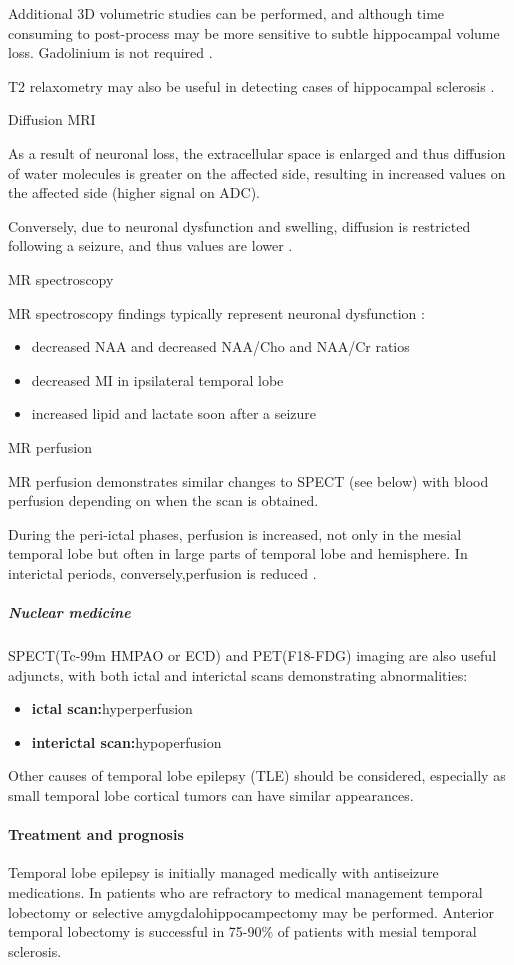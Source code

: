 Additional 3D volumetric studies can be performed, and although time consuming to post-process may be more sensitive to subtle hippocampal volume loss. Gadolinium is not required .

T2 relaxometry may also be useful in detecting cases of hippocampal sclerosis .

Diffusion MRI

As a result of neuronal loss, the extracellular space is enlarged and thus diffusion of water molecules is greater on the affected side, resulting in increased values on the affected side (higher signal on ADC).

Conversely, due to neuronal dysfunction and swelling, diffusion is restricted following a seizure, and thus values are lower .

MR spectroscopy

MR spectroscopy findings typically represent neuronal dysfunction :

\begin{itemize}
	\item
	decreased NAA and decreased NAA/Cho and NAA/Cr ratios
	\item
	decreased MI in ipsilateral temporal lobe
	\item
	increased lipid and lactate soon after a seizure
\end{itemize}

MR perfusion

MR perfusion demonstrates similar changes to SPECT (see below) with blood perfusion depending on when the scan is obtained.

During the peri-ictal phases, perfusion is increased, not only in the mesial temporal lobe but often in large parts of temporal lobe and hemisphere. In interictal periods, conversely,perfusion is reduced .

\subparagraph{Nuclear medicine}

SPECT(Tc-99m HMPAO or ECD) and PET(F18-FDG) imaging are also useful adjuncts, with both ictal and interictal scans demonstrating abnormalities:

\begin{itemize}
	\item
	\textbf{ictal scan:}hyperperfusion
	\item
	\textbf{interictal scan:}hypoperfusion
\end{itemize}

Other causes of temporal lobe epilepsy (TLE) should be considered, especially as small temporal lobe cortical tumors can have similar appearances.

\paragraph{Treatment and prognosis}

Temporal lobe epilepsy is initially managed medically with antiseizure medications. In patients who are refractory to medical management temporal lobectomy or selective amygdalohippocampectomy may be performed. Anterior temporal lobectomy is successful in 75-90\% of patients with mesial temporal sclerosis.